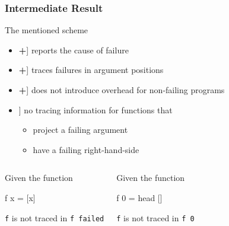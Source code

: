 \documentclass[
,xcolor=dvipsnames
]{beamer}
\newcommand{\pro}{\makebox[1ex]{\color{Green}\bfseries +}}
\newcommand{\con}{\makebox[1ex]{\color{Red}  \bfseries \textendash}}
\begin{document}
\begin{frame}[fragile]%
\frametitle{Intermediate Result}

The mentioned scheme

\begin{itemize}
\item[\pro] reports the cause of failure
\item[\pro] traces failures in argument positions
\item[\pro] does not introduce overhead for non-failing programs
\item[\con] no tracing information for functions that
\begin{itemize}
\item project a failing argument
\item have a failing right-hand-side
\end{itemize}
\end{itemize}

\pause

\vspace{-.5cm}

\begin{columns}[t]
\begin{example}
Given the function
\begin{program}
f x = [x]
\end{program}
\verb!f! is not traced in \verb!f failed!
\end{example}

\pause

\begin{example}
Given the function
\begin{program}
f 0 = head []
\end{program}
\verb!f! is not traced in \verb!f 0!
\end{example}
\end{columns}
\end{frame}
\end{document}
